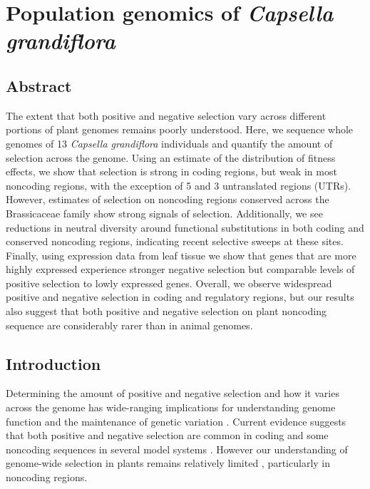 \setlength{\parindent}{0ex}
\setlength{\parskip}{2ex}

\chapter{Population genomics of \textit{Capsella grandiflora}}

\section{Abstract}
The extent that both positive and negative selection vary across different portions of plant genomes remains poorly understood. Here, we sequence whole genomes of 13 \textit{Capsella grandiflora} individuals and quantify the amount of selection across the genome. Using an estimate of the distribution of fitness effects, we show that selection is strong in coding regions, but weak in most noncoding regions, with the exception of 5\textsc{} and 3\textsc{} untranslated regions (UTRs). However, estimates of selection on noncoding regions conserved across the Brassicaceae family show strong signals of selection. Additionally, we see reductions in neutral diversity around functional substitutions in both coding and conserved noncoding regions, indicating recent selective sweeps at these sites. Finally, using expression data from leaf tissue we show that genes that are more highly expressed experience stronger negative selection but comparable levels of positive selection to lowly expressed genes. Overall, we observe widespread positive and negative selection in coding and regulatory regions, but our results also suggest that both positive and negative selection on plant noncoding sequence are considerably rarer than in animal genomes.

\section{Introduction}
Determining the amount of positive and negative selection and how it varies across the genome has wide-ranging implications for understanding genome function and the maintenance of genetic variation \citep{keightley2010}. Current evidence suggests that both positive and negative selection are common in coding and some noncoding sequences in several model systems \citep{andolfatto2005,torgerson2009, lindblad2011, arbiza2013, hough2013, zhen2012, Halligan2013}. However our understanding of genome-wide selection in plants remains relatively limited \citep{hough2013}, particularly in noncoding regions. 

